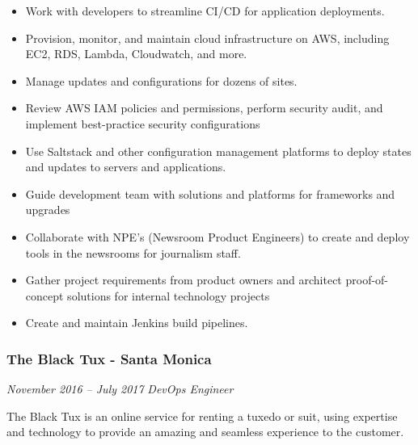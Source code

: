 \documentclass[]{article}
\providecommand{\tightlist}{%
  \setlength{\itemsep}{0pt}\setlength{\parskip}{0pt}}
\begin{document}
\begin{itemize}
\tightlist
\item
  Work with developers to streamline CI/CD for application deployments.
\item
  Provision, monitor, and maintain cloud infrastructure on AWS,
  including EC2, RDS, Lambda, Cloudwatch, and more.
\item
  Manage updates and configurations for dozens of sites.
\item
  Review AWS IAM policies and permissions, perform security audit, and
  implement best-practice security configurations
\item
  Use Saltstack and other configuration management platforms to deploy
  states and updates to servers and applications.
\item
  Guide development team with solutions and platforms for frameworks and
  upgrades
\item
  Collaborate with NPE's (Newsroom Product Engineers) to create and
  deploy tools in the newsrooms for journalism staff.
\item
  Gather project requirements from product owners and architect
  proof-of-concept solutions for internal technology projects
\item
  Create and maintain Jenkins build pipelines.
\end{itemize}

\hypertarget{the-black-tux---santa-monica}{%
\subsubsection{The Black Tux - Santa
Monica}\label{the-black-tux---santa-monica}}

\emph{November 2016 -- July 2017} \emph{DevOps Engineer}

The Black Tux is an online service for renting a tuxedo or suit, using
expertise and technology to provide an amazing and seamless experience
to the customer.
\end{document}
